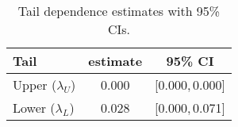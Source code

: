 \begin{table}[t]
  \centering
  \small
  \caption{Tail dependence estimates with 95\% CIs.}
  \begin{tabular}{lcc}
    \toprule
    Tail & estimate & 95\% CI \\
    \midrule
    Upper ($\lambda_U$) & 0.000 & [0.000,\,0.000] \\
    Lower ($\lambda_L$) & 0.028 & [0.000,\,0.071] \\
    \bottomrule
  \end{tabular}
\end{table}
